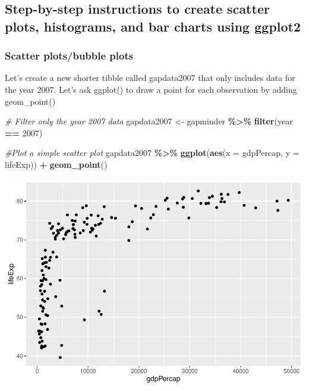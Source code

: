 \documentclass[
]{book}
\newenvironment{Shaded}{\begin{snugshade}}{\end{snugshade}}
\newcommand{\AttributeTok}[1]{\textcolor[rgb]{0.13,0.29,0.53}{#1}}
\newcommand{\CommentTok}[1]{\textcolor[rgb]{0.56,0.35,0.01}{\textit{#1}}}
\newcommand{\DecValTok}[1]{\textcolor[rgb]{0.00,0.00,0.81}{#1}}
\newcommand{\FunctionTok}[1]{\textcolor[rgb]{0.13,0.29,0.53}{\textbf{#1}}}
\newcommand{\NormalTok}[1]{#1}
\newcommand{\OtherTok}[1]{\textcolor[rgb]{0.56,0.35,0.01}{#1}}
\newcommand{\SpecialCharTok}[1]{\textcolor[rgb]{0.81,0.36,0.00}{\textbf{#1}}}
\begin{document}
\subsection{Step-by-step instructions to create scatter plots, histograms, and bar charts using ggplot2}\label{step-by-step-instructions-to-create-scatter-plots-histograms-and-bar-charts-using-ggplot2}

\subsubsection{Scatter plots/bubble plots}\label{scatter-plotsbubble-plots}

Let's create a new shorter tibble called gapdata2007 that only includes data for the year 2007. Let's ask ggplot() to draw a point for each observation by adding geom\_point()

\begin{Shaded}
\begin{Highlighting}[]
\CommentTok{\# Filter only the year 2007 data}
\NormalTok{gapdata2007 }\OtherTok{\textless{}{-}}\NormalTok{ gapminder }\SpecialCharTok{\%\textgreater{}\%}
\FunctionTok{filter}\NormalTok{(year }\SpecialCharTok{==} \DecValTok{2007}\NormalTok{)}

\CommentTok{\#Plot a simple scatter plot }
\NormalTok{gapdata2007 }\SpecialCharTok{\%\textgreater{}\%}
\FunctionTok{ggplot}\NormalTok{(}\FunctionTok{aes}\NormalTok{(}\AttributeTok{x =}\NormalTok{ gdpPercap, }\AttributeTok{y =}\NormalTok{ lifeExp)) }\SpecialCharTok{+}
\FunctionTok{geom\_point}\NormalTok{()}
\end{Highlighting}
\end{Shaded}

\includegraphics{_main_files/figure-latex/unnamed-chunk-76-1.pdf}
\end{document}
